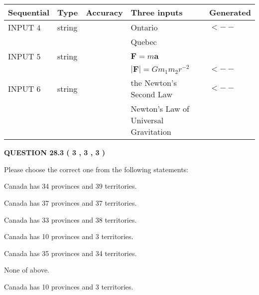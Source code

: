 \documentclass[12pt]{article}
\begin{document}
   
  
  
\noindent\begin{tabular}{|l|l|l|l|l|}
\hline
 Sequential & Type & Accuracy & Three inputs & Generated \\ 
\hline
 
 
  INPUT $            4 $ & string & & 
 Ontario & 
  $ <-- $ 
  \\
  & & & 
 Quebec & 
 \\  \hline  
 
 
  INPUT $            5 $ & string & & 
 $\mathbf{F}=m\mathbf{a}$ & 
  \\
  & & & 
 $\left| \mathbf{F}\right| =Gm_1m_2r^{-2}$ & 
  $ <-- $ 
 \\  \hline  
 
 
  INPUT $            6 $ & string & & 
 the Newton's Second Law & 
  $ <-- $ 
  \\
  & & & 
 Newton's Law of Universal Gravitation & 
 \\  \hline  
 \end{tabular}
   
   
  
\vspace{0.2in}
  
{\textbf{\Large{QUESTION
28.3 
 (           3 ,           3 ,           3 )
}}}
  
  
Please choose the correct one from the following statements:
 
 
Canada has  %
34 provinces and  %
39 territories.
 
 
Canada has  %
37 provinces and  %
37 territories.
 
 
Canada has  %
33 provinces and  %
38 territories.
 
 
Canada has  %
10 provinces and  %
3 territories.
 
 
Canada has  %
35 provinces and  %
34 territories.
 
 
 None of above.
 
 
\noindent{}
 
 
Canada has  %
10 provinces and  %
3 territories.
 
 
\noindent{}
 
\end{document}
